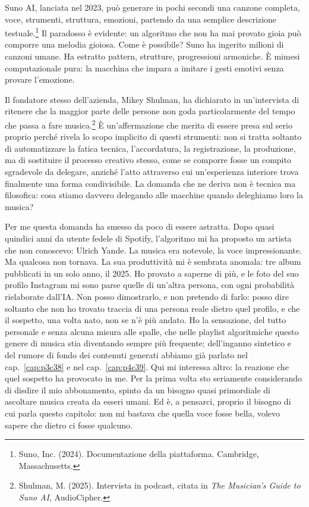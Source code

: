 Suno AI, lanciata nel 2023, pu\`{o} generare in pochi secondi una canzone completa, voce, strumenti, struttura, emozioni, partendo da una semplice descrizione testuale.\footnote{Suno, Inc. (2024). Documentazione della piattaforma. Cambridge, Massachusetts.} Il paradosso \`{e} evidente: un algoritmo che non ha mai provato gioia pu\`{o} comporre una melodia gioiosa. Come \`{e} possibile? Suno ha ingerito milioni di canzoni umane. Ha estratto pattern, strutture, progressioni armoniche. \`{E} mimesi computazionale pura: la macchina che impara a imitare i gesti emotivi senza provare l'emozione.

Il fondatore stesso dell'azienda, Mikey Shulman, ha dichiarato in un'intervista di ritenere che la maggior parte delle persone non goda particolarmente del tempo che passa a fare musica.\footnote{Shulman, M. (2025). Intervista in podcast, citata in \textit{The Musician's Guide to Suno AI}, AudioCipher.} \`{E} un'affermazione che merita di essere presa sul serio proprio perch\'{e} rivela lo scopo implicito di questi strumenti: non si tratta soltanto di automatizzare la fatica tecnica, l'accordatura, la registrazione, la produzione, ma di sostituire il processo creativo stesso, come se comporre fosse un compito sgradevole da delegare, anzich\'{e} l'atto attraverso cui un'esperienza interiore trova finalmente una forma condivisibile. La domanda che ne deriva non \`{e} tecnica ma filosofica: cosa stiamo davvero delegando alle macchine quando deleghiamo loro la musica?

Per me questa domanda ha smesso da poco di essere astratta. Dopo quasi quindici anni da utente fedele di Spotify, l'algoritmo mi ha proposto un artista che non conoscevo: Ulrich Yande. La musica era notevole, la voce impressionante. Ma qualcosa non tornava. La sua produttivit\`{a} mi \`{e} sembrata anomala: tre album pubblicati in un solo anno, il 2025. Ho provato a saperne di pi\`{u}, e le foto del suo profilo Instagram mi sono parse quelle di un'altra persona, con ogni probabilit\`{a} rielaborate dall'IA. Non posso dimostrarlo, e non pretendo di farlo: posso dire soltanto che non ho trovato traccia di una persona reale dietro quel profilo, e che il sospetto, una volta nato, non se n'\`{e} pi\`{u} andato. Ho la sensazione, del tutto personale e senza alcuna misura alle spalle, che nelle playlist algoritmiche questo genere di musica stia diventando sempre pi\`{u} frequente; dell'inganno sintetico e del rumore di fondo dei contenuti generati abbiamo gi\`{a} parlato nel cap.~\ref{cap:p3c38} e nel cap.~\ref{cap:p4c39}. Qui mi interessa altro: la reazione che quel sospetto ha provocato in me. Per la prima volta sto seriamente considerando di disdire il mio abbonamento, spinto da un bisogno quasi primordiale di ascoltare musica creata da esseri umani. Ed \`{e}, a pensarci, proprio il bisogno di cui parla questo capitolo: non mi bastava che quella voce fosse bella, volevo sapere che dietro ci fosse qualcuno.

